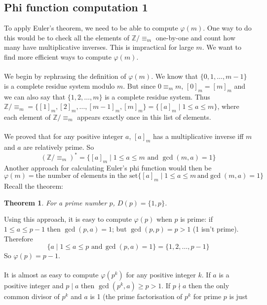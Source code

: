 \documentclass{report}
\newtheorem*{theorem}{Theorem}
\theoremstyle{definition}
\begin{document}
\subsection{Phi function computation 1}
To apply Euler's theorem, we need to be able to compute $\varphi(m)$. One way to do this would be to check all the elements of $\mathbb Z/\equiv_m$ one-by-one and count how many have multiplicative 
inverses. This is impractical for large $m$. We want to find more efficient ways to compute $\varphi(m)$.\\
\vspace{1mm}\\
We begin by rephrasing the definition of $\varphi(m)$. We know that $\{0,1,\ldots,m-1\}$ is a complete residue system modulo $m$. But since $0\equiv_mm$,
$[0]_m=[m]_m$ and we can also say that $\{1,2,\ldots,m\}$ is a
complete residue system. Thus $\mathbb Z/\equiv_m=\{[1]_m,[2]_m,\ldots,[m-1]_m,[m]_m\}=\{[a]_m\mid1\leq a\leq m\}$, where each element of $\mathbb Z/\equiv_m$ appears exactly once in this list of
elements.\\
\vspace{1mm}\\
We proved that for any positive integer $a$, $[a]_m$ has a multiplicative inverse iff $m$ and $a$ are relatively prime. So
\begin{equation*}
(\mathbb Z/\equiv_m)^*=\{[a]_m\mid1\leq a\leq m\text{ and }\gcd(m,a)=1\}
\end{equation*}
Another approach for calculating Euler's phi function would then be
\begin{equation*}
\varphi(m)=\text{the number of elements in the set}\{[a]_m\mid1\leq a\leq m\,\text{and}\gcd(m,a)=1\}
\end{equation*}
Recall the theorem:
\begin{theorem}
For a prime number $p$, $D(p)=\{1,p\}$.
\end{theorem}
\noindent Using this approach, it is easy to compute $\varphi(p)$ when $p$ is prime: if $1\leq a\leq p-1$ then $\gcd(p,a)=1$; but $\gcd(p,p)=p>1$ (1 isn't prime). Therefore
\begin{equation*}
\{a\mid1\leq a\leq p\text{ and}\,\gcd(p,a)=1\}=\{1,2,\ldots,p-1\}
\end{equation*}
So $\varphi(p)=p-1$.\\
\vspace{1mm}\\
It is almost as easy to compute $\varphi(p^k)$ for any positive integer $k$.
If $a$ is a positive integer and $p\mid a$ then $\gcd(p^k,a)\geq p>1$. If $p\nmid a$ then the only common divisor of $p^k$ and $a$ is 1 (the prime factorisation of $p^k$ for prime $p$ is just 
\end{document}

